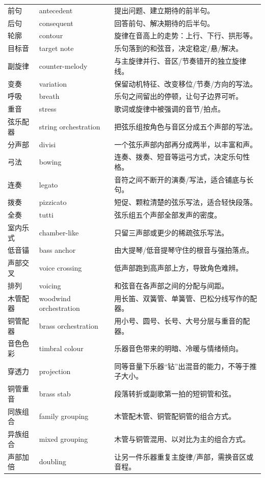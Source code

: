 \begin{longtable}{p{}p{}p{}}
前句 & antecedent & 提出问题、建立期待的前半句。 \\
后句 & consequent & 回答前句、解决期待的后半句。 \\
轮廓 & contour & 旋律在音高上的走势：上行、下行、拱形等。 \\
目标音 & target note & 乐句落到的和弦音，决定稳定/悬/解决。 \\
副旋律 & counter-melody & 与主旋律并行、音区/节奏错开的独立旋律线。 \\
变奏 & variation & 保留动机特征、改变移位/节奏/方向的写法。 \\
呼吸 & breath & 乐句之间留出的停顿，让句子边界可听。 \\
重音 & stress & 歌词或旋律中被强调的音节/拍点。 \\
弦乐配器 & string orchestration & 把弦乐组按角色与音区分成五个声部的写法。 \\
分声部 & divisi & 一个弦乐声部内部再分成两半，以丰富和声。 \\
弓法 & bowing & 连奏、拨奏、短音等运弓方式，决定乐句性格。 \\
连奏 & legato & 音符之间不断开的演奏/写法，适合铺底与长句。 \\
拨奏 & pizzicato & 短促、颗粒清楚的弦乐写法，适合轻快段落。 \\
全奏 & tutti & 弦乐组五个声部全部发声的密度。 \\
室内乐式 & chamber-like & 只留三声部或更少的稀疏弦乐写法。 \\
低音锚 & bass anchor & 由大提琴/低音提琴守住的根音与强拍落点。 \\
声部交叉 & voice crossing & 低声部跑到高声部上方，导致角色难辨。 \\
排列 & voicing & 和弦音在各声部之间的分配与间距。 \\
木管配器 & woodwind orchestration & 用长笛、双簧管、单簧管、巴松分线写作的配器。 \\
铜管配器 & brass orchestration & 用小号、圆号、长号、大号分层与重音的配器。 \\
音色色彩 & timbral colour & 乐器音色带来的明暗、冷暖与情绪倾向。 \\
穿透力 & projection & 同等音量下乐器“钻”出混音的能力，不等于推子大小。 \\
铜管重音 & brass stab & 段落转折或副歌第一拍的短铜管和弦。 \\
同族组合 & family grouping & 木管配木管、铜管配铜管的组合方式。 \\
异族组合 & mixed grouping & 木管与铜管混用、以对比为主的组合方式。 \\
声部加倍 & doubling & 让另一件乐器重复主旋律/声部，需换音区或音程。 \\

\end{longtable}
